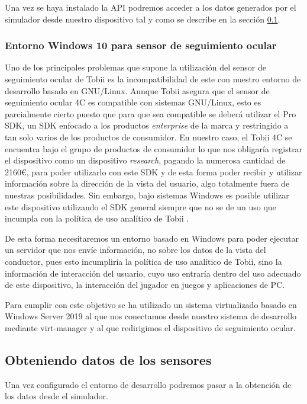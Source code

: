 Una vez se haya instalado la API podremos acceder a los datos generados por el simulador desde nuestro dispositivo tal y como se describe en la sección \ref{sec:datossensores}.


\subsubsection{Entorno Windows 10 para sensor de seguimiento ocular} \label{sec:windows10tobii}
Uno de los principales problemas que supone la utilización del sensor de seguimiento ocular de Tobii es la incompatibilidad de este con nuestro entorno de desarrollo basado en GNU/Linux.
Aunque Tobii asegura que el sensor de seguimiento ocular 4C es compatible con sistemas GNU/Linux, esto es parcialmente cierto puesto que para que sea compatible se deberá utilizar el Pro SDK, un SDK enfocado a los productos \textit{enterprise} de la marca y restringido a tan solo varios de los productos de consumidor.
En nuestro caso, el Tobii 4C se encuentra bajo el grupo de productos de consumidor lo que nos obligaría registrar el dispositivo como un dispositivo \textit{research}, pagando la numerosa cantidad de 2160\euro, para poder utilizarlo con este SDK y de esta forma poder recibir y utilizar información sobre la dirección de la vista del usuario, algo totalmente fuera de nuestras posibilidades.
Sin embargo, bajo sistemas Windows es posible utilizar este dispositivo utilizando el SDK general siempre que no se de un uso que incumpla con la política de uso analítico de Tobii \cite{tobiiAnalyticalUse}.

De esta forma necesitaremos un entorno basado en Windows para poder ejecutar un servidor que nos envíe información, no sobre los datos de la vista del conductor, pues esto incumpliría la política de uso analítico de Tobii, sino la información de interacción del usuario, cuyo uso entraría dentro del uso adecuado de este dispositivo, la interacción del jugador en juegos y aplicaciones de PC.

Para cumplir con este objetivo se ha utilizado un sistema virtualizado basado en Windows Server 2019 al que nos conectamos desde nuestro sistema de desarrollo mediante virt-manager y al que redirigimos el dispositivo de seguimiento ocular. 





\clearpage
\subsection{Obteniendo datos de los sensores} \label{sec:datossensores}
Una vez configurado el entorno de desarrollo podremos pasar a la obtención de los datos desde el simulador.

